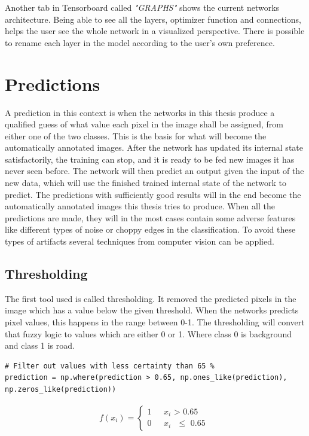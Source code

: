 \documentclass[USenglish]{ifimaster}  %
\begin{document}
Another tab in Tensorboard called \textit{"GRAPHS"} shows the current networks architecture. Being able to see all the layers, optimizer function and connections, helps the user see the whole network in a visualized perspective. There is possible to rename each layer in the model according to the user's own preference. 
\section{Predictions}
A prediction in this context is when the networks in this thesis produce a qualified guess of what value each pixel in the image shall be assigned, from either one of the two classes. This is the basis for what will become the automatically annotated images. After the network has updated its internal state satisfactorily, the training can stop, and it is ready to be fed new images it has never seen before. The network will then predict an output given the input of the new data, which will use the finished trained internal state of the network to predict. The predictions with sufficiently good results will in the end become the automatically annotated images this thesis tries to produce. When all the predictions are made, they will in the most cases contain some adverse features like different types of noise or choppy edges in the classification. To avoid these types of artifacts several techniques from computer vision can be applied. 
\subsection{Thresholding}
The first tool used is called thresholding. It removed the predicted pixels in the image which has a value below the given threshold. When the networks predicts pixel values, this happens in the range between 0-1. The thresholding will convert that fuzzy logic to values which are either 0 or 1. Where class 0 is background and class 1 is road.
\begin{verbatim}
# Filter out values with less certainty than 65 %
prediction = np.where(prediction > 0.65, np.ones_like(prediction), 
np.zeros_like(prediction))
\end{verbatim}

\begin{equation}\label{eq:thresholding}
\begin{aligned}
{f(x_i)=
\begin{cases}
    1 & \text{ $x_i$ > 0.65 }  \\
    0 & \text{ $x_i$ $\leq$ 0.65 }
\end{cases}}
\end{aligned}
\end{equation}
\end{document}
